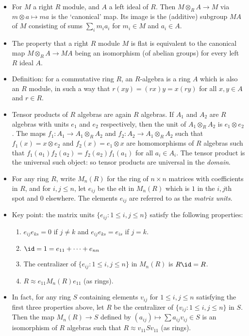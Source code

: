 \documentclass[11pt]{amsart}
\begin{document}
\begin{itemize}
  \item For $M$ a right $R$ module, and $A$ a left ideal of $R$. Then $M\otimes_R A \to M$ via $m\otimes a \mapsto ma$ is the `canonical' map. Its image is the (additive) subgroup $MA$ of $M$ consisting of sums $\sum_i m_i a_i$ for $m_i \in M$ and $a_i \in A$.
  \item The property that a right $R$ module $M$ is flat is equivalent to the canonical map $M\otimes _R A \to MA$ being an isomorphism (of abelian groups) for every left $R$ ideal $A$. 
  \item Definition: for a commutative ring $R$, an $R$-algebra is a ring $A$ which is also an $R$ module, in such a way that $ r(xy)=(rx)y=x(ry)$  for all $x,y \in A$ and $r\in R$.
  \item Tensor products of $R$ algebras are again $R$ algebras. If $A_1$ and $A_2$ are $R$ algebras with units $e_1$ and $e_2$ respectively, then the unit of $A_1 \otimes_R A_2$ is $e_1 \otimes e_2$.  The maps $f_1: A_1 \to A_1 \otimes_R A_2$ and $f_2:A_2 \to A_1 \otimes_R A_2$ such that $f_1(x)=x \otimes e_2$ and $f_2(x)= e_1 \otimes x$ are homomorphisms of $R$ algebras such that $f_1(a_1)f_2(a_2)=f_2(a_2)f_1(a_1)$ for all $a_i \in A_i$. The tensor product is the universal such object: so tensor products are universal in the \emph{domain}.
  \item For any ring $R$, write $M_n(R)$ for the ring of $n\times n$ matrices with coefficients in $R$, and for $i,j \leq n$, let $e_{ij}$ be the elt in $M_n(R)$ which is $1$ in the $i,j$th spot and $0$ elsewhere. The elements $e_{ij}$ are referred to as the \emph{matrix units}. 
  \item Key point: the matrix units $\{ e_{ij} : 1\leq i,j\leq n\}$ satisfy the following properties:
 	\begin{enumerate}
  		\item $e_{ij}e_{ks} = 0$ if $j\neq k$ and $e_{ij}e_{ks} = e_{is}$ if $j=k$. 
  		\item $ \id = 1 = e_{11} + \cdots + e_{nn}$
  		\item  The centralizer of $\{ e_{ij}: 1\leq i,j \leq n\}$ in $M_n(R)$ is $R\id =R$. 
  		\item $R\approx e_{11} M_n(R) e_{11}$ (as rings).  
  	\end{enumerate} 
  \item In fact, for any ring $S$ containing elements $v_{ij}$ for $1 \leq i,j \leq n$ satisfying the first three properties above, let $R$ be the centralizer of $\{ v_{ij} :  1\leq i,j\leq n\}$ in $S$. Then the map $M_n(R) \to S$ defined by $(a_{ij}) \mapsto \sum a_{ij} v_{ij} \in S$  is an isomorphism of $R$ algebras such that $R \approx v_{11} S v_{11}$  (as rings).

\end{itemize}
\end{document}
